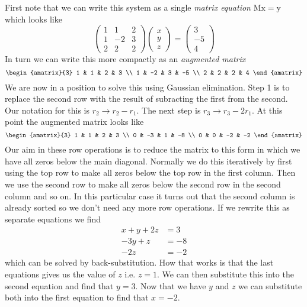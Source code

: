 First note that we can write this system as a single \emph{matrix equation}
$\mathrm{Mx} = \mathrm{y}$ which looks like
\[
    \begin{pmatrix}
        1 & 1 & 2 \\
        1 & -2 & 3 \\
        2 & 2 & 2
    \end{pmatrix}
    \begin{pmatrix}
        x \\ y \\ z
    \end{pmatrix}
       =
    \begin{pmatrix}
        3 \\ -5 \\ 4
    \end{pmatrix}
\]
In turn we can write this more compactly as an \emph{augmented matrix}
\[
    \begin{amatrix}{3}
        1 & 1 & 2 & 3 \\
        1 & -2 & 3 & -5 \\
        2 & 2 & 2 & 4
    \end{amatrix}
\]
We are now in a position to solve this using Gaussian elimination. Step 1 is
to replace the second row with the result of subracting the first from the
second. Our notation for this is $r_2 \to r_2 - r_1$. The next step is $r_3
\to r_3 - 2r_1$. At this point the augmented matrix looks like
\[
    \begin{amatrix}{3}
        1 & 1 & 2 & 3 \\
        0 & -3 & 1 & -8 \\
        0 & 0 & -2 & -2
    \end{amatrix}
\]
Our aim in these row operations is to reduce the matrix to this form in which
we have all zeros below the main diagonal. Normally we do this iteratively by
first using the top row to make all zeros below the top row in the first
column. Then we use the second row to make all zeros below the second row in
the second column and so on. In this particular case it turns out that the
second column is already sorted so we don't need any more row operations.
If we rewrite this as separate equations we find
\begin{align*}
    x +y + 2z &= 3\\
     -3y + z  &= -8\\
          -2z &= -2
    \label{system1}
\end{align*}
which can be solved by back-substitution. How that works is that the last
equations gives us the value of $z$ i.e. $z=1$. We can then substitute this
into the second equation and find that $y=3$. Now that we have $y$ and $z$ we
can substitute both into the first equation to find that $x=-2$.

